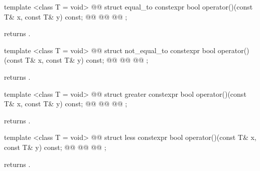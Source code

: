 %
\begin{itemdecl}
template <class T = void>
  @@
struct equal_to {
  constexpr bool operator()(const T& x, const T& y) const;
  @@
  @@
  @@
};
\end{itemdecl}

\begin{itemdescr}
\pnum
{} returns .
\end{itemdescr}

%
\begin{itemdecl}
template <class T = void>
  @@
struct not_equal_to {
  constexpr bool operator()(const T& x, const T& y) const;
  @@
  @@
  @@
};
\end{itemdecl}

\begin{itemdescr}
\pnum
{} returns .
\end{itemdescr}

%
\begin{itemdecl}
template <class T = void>
  @@
struct greater {
  constexpr bool operator()(const T& x, const T& y) const;
  @@
  @@
  @@
};
\end{itemdecl}

\begin{itemdescr}
\pnum
{} returns .
\end{itemdescr}

%
\begin{itemdecl}
template <class T = void>
  @@
struct less {
  constexpr bool operator()(const T& x, const T& y) const;
  @@
  @@
  @@
};
\end{itemdecl}

\begin{itemdescr}
\pnum
{} returns .
\end{itemdescr}

